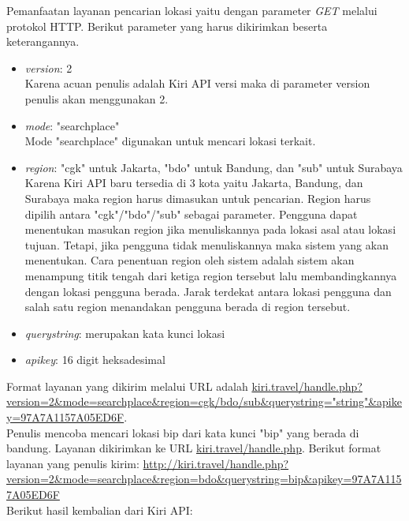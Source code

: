\hspace{0.5cm} Pemanfaatan layanan pencarian lokasi yaitu dengan parameter \textit{GET} melalui protokol HTTP. Berikut parameter yang harus dikirimkan beserta keterangannya.
\begin{itemize}
	\item \textit{version}: 2 \\
	Karena acuan penulis adalah Kiri API versi maka di parameter version penulis akan menggunakan 2.
	\item \textit{mode}: "searchplace" \\
	Mode "searchplace" digunakan untuk mencari lokasi terkait.
	\item \textit{region}: "cgk" untuk Jakarta, "bdo" untuk Bandung, dan "sub" untuk Surabaya \\
	Karena Kiri API baru tersedia di 3 kota yaitu Jakarta, Bandung, dan Surabaya maka region harus dimasukan untuk pencarian. Region harus dipilih antara "cgk"/"bdo"/"sub" sebagai parameter. Pengguna dapat menentukan masukan region jika menuliskannya pada lokasi asal atau lokasi tujuan. Tetapi, jika pengguna tidak menuliskannya maka sistem yang akan menentukan. Cara penentuan region oleh sistem adalah sistem akan menampung titik tengah dari ketiga region tersebut lalu membandingkannya dengan lokasi pengguna berada. Jarak terdekat antara lokasi pengguna dan salah satu region menandakan pengguna berada di region tersebut.
	\item \textit{querystring}: merupakan kata kunci lokasi 
	\item \textit{apikey}: 16 digit heksadesimal
\end{itemize}
Format layanan yang dikirim melalui URL adalah \url{kiri.travel/handle.php?version=2&mode=searchplace&region=cgk/bdo/sub&querystring="string"&apikey=97A7A1157A05ED6F}.
\newline
\\Penulis mencoba mencari lokasi bip dari kata kunci "bip" yang berada di bandung. Layanan dikirimkan ke URL \url{kiri.travel/handle.php}. 
Berikut format layanan yang penulis kirim:\newline
{\url{http://kiri.travel/handle.php?version=2&mode=searchplace&region=bdo&querystring=bip&apikey=97A7A1157A05ED6F}}
\newline
\\Berikut hasil kembalian dari Kiri API: 

